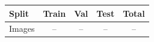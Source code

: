 \begin{tabular}{lcccc}\toprule Split & Train & Val & Test & Total \\ \midrule Images & -- & -- & -- & -- \\ \bottomrule\end{tabular}
